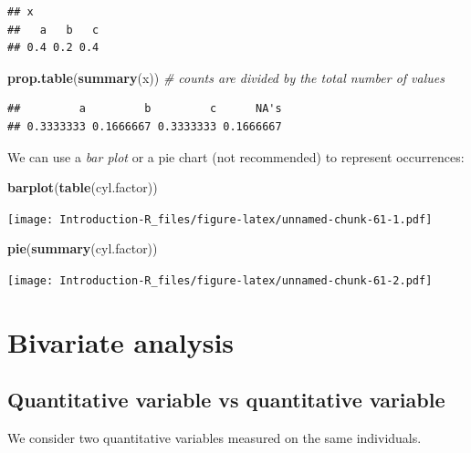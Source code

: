 \documentclass[]{book}
\newenvironment{Shaded}{\begin{snugshade}}{\end{snugshade}}
\newcommand{\CommentTok}[1]{\textcolor[rgb]{0.56,0.35,0.01}{\textit{#1}}}
\newcommand{\KeywordTok}[1]{\textcolor[rgb]{0.13,0.29,0.53}{\textbf{#1}}}
\newcommand{\NormalTok}[1]{#1}
\begin{document}
\begin{verbatim}
## x
##   a   b   c 
## 0.4 0.2 0.4
\end{verbatim}

\begin{Shaded}
\begin{Highlighting}[]
\KeywordTok{prop.table}\NormalTok{(}\KeywordTok{summary}\NormalTok{(x)) }\CommentTok{# counts are divided by the total number of values}
\end{Highlighting}
\end{Shaded}

\begin{verbatim}
##         a         b         c      NA's 
## 0.3333333 0.1666667 0.3333333 0.1666667
\end{verbatim}

We can use a \emph{bar plot} or a pie chart (not recommended) to represent occurrences:

\begin{Shaded}
\begin{Highlighting}[]
\KeywordTok{barplot}\NormalTok{(}\KeywordTok{table}\NormalTok{(cyl.factor))}
\end{Highlighting}
\end{Shaded}

\texttt{[image: Introduction-R\_files/figure-latex/unnamed-chunk-61-1.pdf]}

\begin{Shaded}
\begin{Highlighting}[]
\KeywordTok{pie}\NormalTok{(}\KeywordTok{summary}\NormalTok{(cyl.factor))}
\end{Highlighting}
\end{Shaded}

\texttt{[image: Introduction-R\_files/figure-latex/unnamed-chunk-61-2.pdf]}

\hypertarget{bivariate-analysis}{%
\section{Bivariate analysis}\label{bivariate-analysis}}

\hypertarget{quantitative-variable-vs-quantitative-variable}{%
\subsection{Quantitative variable vs quantitative variable}\label{quantitative-variable-vs-quantitative-variable}}

We consider two quantitative variables measured on the same individuals.
\end{document}
